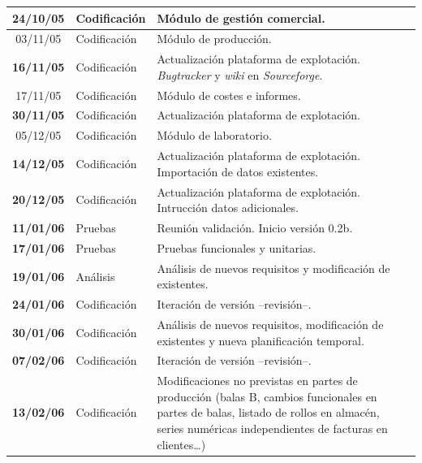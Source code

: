 \documentclass[a4paper]{article}
\begin{document}
\begin{center}
\begin{longtable}{|| c | l | p{} ||}
                \hline
                24/10/05 & Codificación & Módulo de gestión comercial. \\
                \hline
                03/11/05 & Codificación & Módulo de producción. \\
                \hline
                \textbf{16/11/05} & Codificación & Actualización plataforma de explotación. \emph{Bugtracker} y \emph{wiki} en \emph{Sourceforge}.\\
                \hline
                17/11/05 & Codificación & Módulo de costes e informes. \\
                \hline
                \textbf{30/11/05} & Codificación & Actualización plataforma de explotación. \\
                \hline
                05/12/05 & Codificación & Módulo de laboratorio. \\
                \hline
                \textbf{14/12/05} & Codificación & Actualización plataforma de explotación. Importación de datos existentes. \\
                \hline
                \textbf{20/12/05} & Codificación & Actualización plataforma de explotación. Intrucción datos adicionales. \\
                \hline
                \textbf{11/01/06} & Pruebas & Reunión validación. Inicio versión 0.2b. \\
                \hline
                \textbf{17/01/06} & Pruebas & Pruebas funcionales y unitarias. \\
                \hline
                \textbf{19/01/06} & Análisis & Análisis de nuevos requisitos y modificación de existentes. \\
                \hline
                \textbf{24/01/06} & Codificación & Iteración de versión --revisión--. \\
                \hline
                \textbf{30/01/06} & Codificación & Análisis de nuevos requisitos, modificación de existentes y nueva planificación temporal. \\
                \hline
                \textbf{07/02/06} & Codificación & Iteración de versión --revisión--. \\
                \hline
                \hline
                \textbf{13/02/06} & Codificación & Modificaciones no previstas en partes de producción (balas B, cambios funcionales en partes de balas, listado de rollos en almacén, series numéricas independientes de facturas en clientes\dots) \\

\end{longtable}
\end{center}
\end{document}
